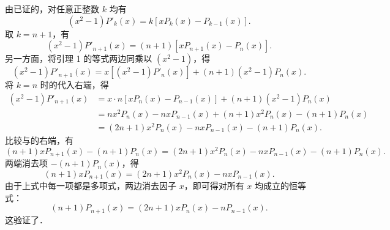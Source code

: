 \begin{myproof}
    由已证的，对任意正整数 $k$ 均有
    \begin{equation}\label{eq:proof-a-1}
        (x^2 - 1) P'_k(x) = k \left[ x P_k(x) - P_{k-1}(x) \right].
    \end{equation}
    取 $k = n+1$，有
    \begin{equation}\label{eq:proof-a-2}
        (x^2 - 1) P'_{n+1}(x) = (n+1) \left[ x P_{n+1}(x) - P_n(x) \right].
    \end{equation}
    另一方面，将引理 1 的等式两边同乘以 $(x^2 - 1)$，得
    \begin{equation}\label{eq:proof-a-3}
        (x^2 - 1) P'_{n+1}(x) = x \left[ (x^2 - 1) P'_n(x) \right] + (n+1)(x^2 - 1) P_n(x).
    \end{equation}
    将 $k = n$ 时的代入右端，得
    \begin{equation}\label{eq:proof-a-4}
        \begin{aligned}
            (x^2 - 1) P'_{n+1}(x) & = x \cdot n \left[ x P_n(x) - P_{n-1}(x) \right] + (n+1)(x^2 - 1) P_n(x) \\
                                  & = n x^2 P_n(x) - n x P_{n-1}(x) + (n+1) x^2 P_n(x) - (n+1) P_n(x)        \\
                                  & = (2n+1) x^2 P_n(x) - n x P_{n-1}(x) - (n+1) P_n(x).
        \end{aligned}
    \end{equation}
    比较与的右端，有
    \begin{equation}\label{eq:proof-a-5}
        (n+1) x P_{n+1}(x) - (n+1) P_n(x) = (2n+1) x^2 P_n(x) - n x P_{n-1}(x) - (n+1) P_n(x).
    \end{equation}
    两端消去项 $-(n+1) P_n(x)$，得
    \begin{equation}\label{eq:proof-a-6}
        (n+1) x P_{n+1}(x) = (2n+1) x^2 P_n(x) - n x P_{n-1}(x).
    \end{equation}
    由于上式中每一项都是多项式，两边消去因子 $x$，即可得对所有 $x$ 均成立的恒等式：
    \begin{equation}\label{eq:proof-a-final}
        (n+1) P_{n+1}(x) = (2n+1) x P_n(x) - n P_{n-1}(x).
    \end{equation}
    这验证了．
\end{myproof}

\endinput
